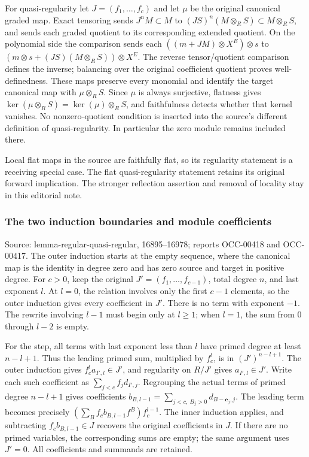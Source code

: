 For quasi-regularity let \(J=(f_1,\ldots,f_c)\) and let \(\mu\) be the original canonical graded map. Exact tensoring sends \(J^nM\subset M\) to \((JS)^n(M\otimes_RS)\subset M\otimes_RS\), and sends each graded quotient to its corresponding extended quotient. On the polynomial side the comparison sends each \(((m+JM)\otimes X^E)\otimes s\) to \((m\otimes s+(JS)(M\otimes_RS))\otimes X^E\). The reverse tensor/quotient comparison defines the inverse; balancing over the original coefficient quotient proves well-definedness. These maps preserve every monomial and identify the target canonical map with \(\mu\otimes_RS\). Since \(\mu\) is always surjective, flatness gives \(\ker(\mu\otimes_RS)=\ker(\mu)\otimes_RS\), and faithfulness detects whether that kernel vanishes. No nonzero-quotient condition is inserted into the source's different definition of quasi-regularity. In particular the zero module remains included there.

Local flat maps in the source are faithfully flat, so its regularity statement is a receiving special case. The flat quasi-regularity statement retains its original forward implication. The stronger reflection assertion and removal of locality stay in this editorial note.

\subsubsection{The two induction boundaries and module coefficients}\label{algebra-proof-006-the-two-induction-boundaries-and-module-coefficients}

Source: lemma-regular-quasi-regular, 16895--16978; reports OCC-00418 and OCC-00417. The outer induction starts at the empty sequence, where the canonical map is the identity in degree zero and has zero source and target in positive degree. For \(c>0\), keep the original \(J'=(f_1,\ldots,f_{c-1})\), total degree \(n\), and last exponent \(l\). At \(l=0\), the relation involves only the first \(c-1\) elements, so the outer induction gives every coefficient in \(J'\). There is no term with exponent \(-1\). The rewrite involving \(l-1\) must begin only at \(l\geq1\); when \(l=1\), the sum from 0 through \(l-2\) is empty.

For the step, all terms with last exponent less than \(l\) have primed degree at least \(n-l+1\). Thus the leading primed sum, multiplied by \(f_c^l\), is in \((J')^{n-l+1}\). The outer induction gives \(f_c^l a_{I',l}\in J'\), and regularity on \(R/J'\) gives \(a_{I',l}\in J'\). Write each such coefficient as \(\sum_{j<c}f_jd_{I',j}\). Regrouping the actual terms of primed degree \(n-l+1\) gives coefficients \(b_{B,l-1}=\sum_{j<c,\ B_j>0}d_{B-\mathbf e_j,j}\). The leading term becomes precisely \((\sum_B f_cb_{B,l-1}f^B)f_c^{l-1}\). The inner induction applies, and subtracting \(f_cb_{B,l-1}\in J\) recovers the original coefficients in \(J\). If there are no primed variables, the corresponding sums are empty; the same argument uses \(J'=0\). All coefficients and summands are retained.

